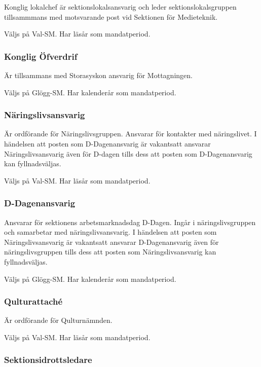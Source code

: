 \documentclass{dgovdoc}
\begin{document}
Konglig lokalchef är sektionslokalsansvarig och leder sektionslokalsgruppen
tillsammmans med motsvarande post vid Sektionen för Medieteknik.

Väljs på Val-SM. Har läsår som mandatperiod.

\subsubsection{Konglig Öfverdrif}

Är tillsammans med Storasyskon ansvarig för Mottagningen.

Väljs på Glögg-SM. Har kalenderår som mandatperiod.

\subsubsection{Näringslivsansvarig}

Är ordförande för Näringslivsgruppen. Ansvarar för kontakter med näringslivet. I händelsen att posten som D-Dagenansvarig är vakantsatt ansvarar Näringslivsansvarig även för D-dagen tills dess att posten som D-Dagenansvarig kan fyllnadsväljas.


Väljs på Val-SM. Har läsår som mandatperiod.

\subsubsection{D-Dagenansvarig}

Ansvarar för sektionens arbetsmarknadsdag D-Dagen. Ingår i näringslivsgruppen och samarbetar med näringslivsansvarig. I händelsen att posten som Näringslivsansvarig är vakantsatt ansvarar D-Dagenansvarig även för näringslivsgruppen tills dess att posten som Näringslivsansvarig kan fyllnadsväljas.


Väljs på Glögg-SM. Har kalenderår som mandatperiod.

\subsubsection{Qulturattaché}

Är ordförande för Qulturnämnden.

Väljs på Val-SM. Har läsår som mandatperiod.

\subsubsection{Sektionsidrottsledare}
\end{document}
